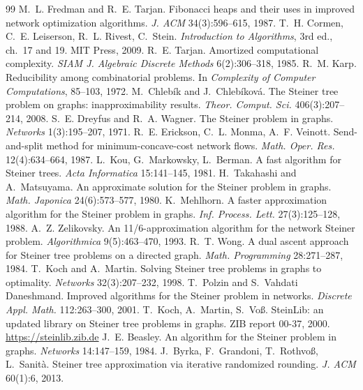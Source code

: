\documentclass[11pt,a4paper]{article}
\theoremstyle{plain}\newtheorem{theorem}{Theorem}[section]
\theoremstyle{definition}\newaliascnt{definition}{theorem}\newtheorem{definition}[definition]{Definition}\aliascntresetthe{definition}
\begin{document}







\begin{thebibliography}{99}\small
{} M.~L. Fredman and R.~E. Tarjan. Fibonacci heaps and their uses in improved network optimization algorithms. \emph{J. ACM} 34(3):596--615, 1987.
 T.~H. Cormen, C.~E. Leiserson, R.~L. Rivest, C.~Stein. \emph{Introduction to Algorithms}, 3rd ed., ch.~17 and 19. MIT Press, 2009.
 R.~E. Tarjan. Amortized computational complexity. \emph{SIAM J. Algebraic Discrete Methods} 6(2):306--318, 1985.
 R.~M. Karp. Reducibility among combinatorial problems. In \emph{Complexity of Computer Computations}, 85--103, 1972.
 M.~Chleb\'ik and J.~Chleb\'ikov\'a. The Steiner tree problem on graphs: inapproximability results. \emph{Theor. Comput. Sci.} 406(3):207--214, 2008.
 S.~E. Dreyfus and R.~A. Wagner. The Steiner problem in graphs. \emph{Networks} 1(3):195--207, 1971.
 R.~E. Erickson, C.~L. Monma, A.~F. Veinott. Send-and-split method for minimum-concave-cost network flows. \emph{Math. Oper. Res.} 12(4):634--664, 1987.
 L.~Kou, G.~Markowsky, L.~Berman. A fast algorithm for Steiner trees. \emph{Acta Informatica} 15:141--145, 1981.
 H.~Takahashi and A.~Matsuyama. An approximate solution for the Steiner problem in graphs. \emph{Math. Japonica} 24(6):573--577, 1980.
 K.~Mehlhorn. A faster approximation algorithm for the Steiner problem in graphs. \emph{Inf. Process. Lett.} 27(3):125--128, 1988.
 A.~Z. Zelikovsky. An 11/6-approximation algorithm for the network Steiner problem. \emph{Algorithmica} 9(5):463--470, 1993.
 R.~T. Wong. A dual ascent approach for Steiner tree problems on a directed graph. \emph{Math. Programming} 28:271--287, 1984.
 T.~Koch and A.~Martin. Solving Steiner tree problems in graphs to optimality. \emph{Networks} 32(3):207--232, 1998.
 T.~Polzin and S.~Vahdati Daneshmand. Improved algorithms for the Steiner problem in networks. \emph{Discrete Appl. Math.} 112:263--300, 2001.
 T.~Koch, A.~Martin, S.~Vo\ss. SteinLib: an updated library on Steiner tree problems in graphs. ZIB report 00-37, 2000. \url{https://steinlib.zib.de}
 J.~E. Beasley. An algorithm for the Steiner problem in graphs. \emph{Networks} 14:147--159, 1984.
 J.~Byrka, F.~Grandoni, T.~Rothvo\ss, L.~Sanit\`a. Steiner tree approximation via iterative randomized rounding. \emph{J. ACM} 60(1):6, 2013.
\end{thebibliography}

\appendix

\end{document}
